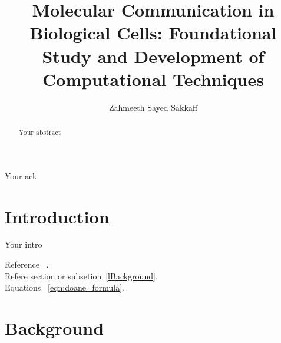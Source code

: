 \documentclass[print,phd]{nuthesis}
\begin{document}
\frontmatter
\title{{\fontsize{12}{14}\selectfont Molecular Communication in Biological Cells: Foundational Study and Development of Computational Techniques}}
\author{Zahmeeth Sayed Sakkaff}

\maketitle

\begin{abstract}
\label{sec:summary}

\par Your abstract
\end{abstract}



\begin{acknowledgments}
\label{sec:ack}

\par Your ack
\end{acknowledgments}

\begin{KeepFromToc}
  \tableofcontents
\end{KeepFromToc}

\newpage
\listoffigures
\listoftables

\mainmatter

\chapter{Introduction}
\label{sec:Introduction}
\par Your intro

Reference ~\cite{Mahner08}. \\
Refere section or subsetion~\ref{lBackground}.\\
Equations ~\eqref{eqn:doane_formula}.

\chapter{Background}
\label{sec:Background}
\end{document}
